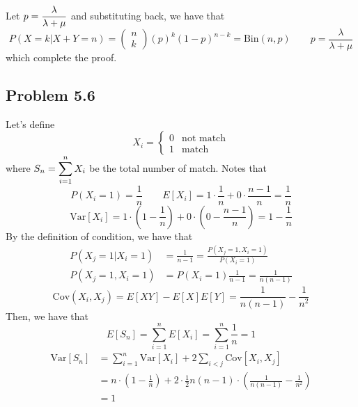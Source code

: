 \documentclass[12pt]{article}
\begin{document}
	Let $\displaystyle p = \frac{\lambda }{\lambda +\mu } $ and substituting back, we have that 
	$$\boxed{ P\left( X=k|X+Y=n\right)=\begin{pmatrix}n\\ k\end{pmatrix} \left( p\right)^{k}  \left( 1-p\right)^{n-k}  =\text{Bin}(n, p) \qquad p = \frac{\lambda }{\lambda +\mu } }$$
	which complete the proof. 
	\\






\subsection*{\bf Problem 5.6}

	Let's define
	$$X_i=\begin{cases}0&\text{not match} \\ 1&\text{match} \end{cases} $$
	where $\displaystyle S_{n}=\sum^{n}_{i=1} X_{i}$ be the total number of match.
	Notes that 
	$$P\left( X_{i}=1\right)  =\frac{1}{n} \qquad E\left[ X_{i}\right]  =1\cdot \frac{1}{n} +0\cdot \frac{n-1}{n} =\frac{1}{n} $$
	$$\text{Var} \left[ X_{i}\right]  =1\cdot \left( 1-\frac{1}{n} \right)  +0\cdot \left( 0-\frac{n-1}{n} \right)  =1-\frac{1}{n} $$ 
	By the definition of condition, we have that 
	$$\begin{aligned}
		P\left( X_{j}=1|X_{i}=1\right)  
		&=\frac{1}{n-1} =\frac{P\left( X_{j}=1,X_{i}=1\right)  }{P\left( X_{i}=1\right)  } \\ P\left( X_{j}=1,X_{i}=1\right)  
		&=P\left( X_{i}=1\right)  \frac{1}{n-1} =\frac{1}{n\left( n-1\right)  } 
	\end{aligned} $$
	$$\text{Cov} \left( X_{i},X_{j}\right)  =E\left[ XY\right]  -E\left[ X\right]  E\left[ Y\right]=\frac{1}{n\left( n-1\right)  } -\frac{1}{n^{2}}$$
	Then, we have that 
	$$\boxed{ E\left[ S_{n}\right]  =\sum^{n}_{i=1} E\left[ X_{i}\right] =\sum^{n}_{i=1} \frac{1}{n} =1 }$$	
	$$\boxed{ \begin{aligned}
		\text{Var} \left[ S_{n}\right]  
		&=\sum^{n}_{i=1} \text{Var} \left[ X_{i}\right]  +2\sum_{i<j} \text{Cov} \left[ X_{i},X_{j}\right]  \\ 
		&=n\cdot \left( 1-\frac{1}{n} \right)  +2\cdot \frac{1}{2} n\left( n-1\right)  \cdot \left( \frac{1}{n\left( n-1\right)  } -\frac{1}{n^{2}} \right)  \\ 
		&= 1
	\end{aligned} } $$
	\\
\end{document}
